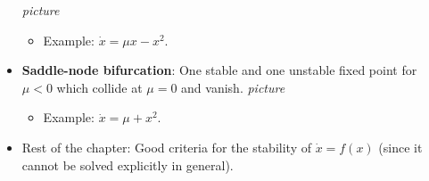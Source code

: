 \documentclass[../notes.tex]{subfiles}
\begin{document}
\begin{itemize}
    \emph{picture}
    \begin{itemize}
        \item Example: $\dot{x}=\mu x-x^2$.
    \end{itemize}
    \item \textbf{Saddle-node bifurcation}: One stable and one unstable fixed point for $\mu<0$ which collide at $\mu=0$ and vanish.
    \emph{picture}
    \begin{itemize}
        \item Example: $\dot{x}=\mu+x^2$.
    \end{itemize}
    \item Rest of the chapter: Good criteria for the stability of $\dot{x}=f(x)$ (since it cannot be solved explicitly in general).
\end{itemize}
\end{document}
